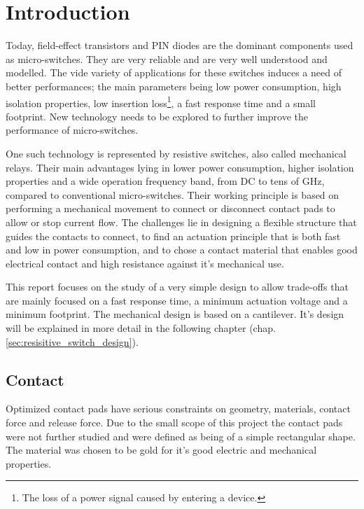 \section{Introduction}
\label{sec:introduction}
Today, field-effect transistors and PIN diodes are the dominant components used as micro-switches. 
They are very reliable and are very well understood and modelled. 
The vide variety of applications for these switches induces a need of better performances; the main parameters being low power consumption, high isolation properties, low insertion loss\footnote{The loss of a power signal caused by entering a device.}, a fast response time and a small footprint.
New technology needs to be explored to further improve the performance of micro-switches.

One such technology is represented by resistive switches, also called mechanical relays.
Their main advantages lying in lower power consumption, higher isolation properties and a wide operation frequency band, from DC to tens of GHz, compared to conventional micro-switches.
Their working principle is based on performing a mechanical movement to connect or disconnect contact pads to allow or stop current flow.
The challenges lie in designing a flexible structure that guides the contacts to connect, to find an actuation principle that is both fast and low in power consumption, and to chose a contact material that enables good electrical contact and high resistance against it's mechanical use.

This report focuses on the study of a very simple design to allow trade-offs that are mainly focused on a fast response time, a minimum actuation voltage and a minimum footprint.
The mechanical design is based on a cantilever.
It's design will be explained in more detail in the following chapter (chap. \ref{sec:resisitive_switch_design}).\cite{shaw2012mems}

\subsection{Contact}
\label{sec:contact}
Optimized contact pads have serious constraints on geometry, materials, contact force and release force. 
Due to the small scope of this project the contact pads were not further studied and were defined as being of a simple rectangular shape.
The material was chosen to be gold for it's good electric and mechanical properties. 

